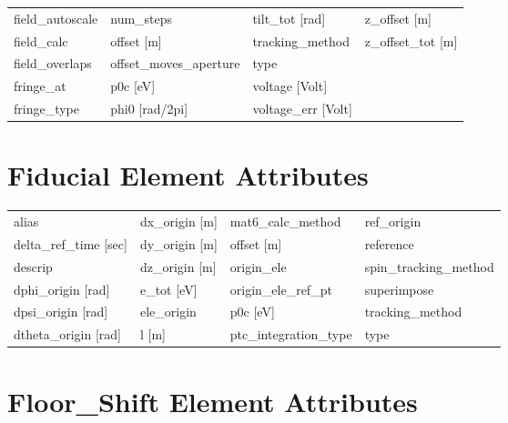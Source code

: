 \begin{tabular}{llll}
field_autoscale                & num_steps                      & tilt_tot [rad]                 & z_offset [m]                   \\
field_calc                     & offset [m]                     & tracking_method                & z_offset_tot [m]               \\
field_overlaps                 & offset_moves_aperture          & type                           &                                \\
fringe_at                      & p0c [eV]                       & voltage [Volt]                 &                                \\
fringe_type                    & phi0 [rad/2pi]                 & voltage_err [Volt]             &                                \\
 \bottomrule
 \end{tabular}
 \vfill
 
 \section{Fiducial Element Attributes}
 \label{s:list.fiducial}
 
 \begin{tabular}{llll} \toprule
alias                          & dx_origin [m]                  & mat6_calc_method               & ref_origin                     \\
delta_ref_time [sec]           & dy_origin [m]                  & offset [m]                     & reference                      \\
descrip                        & dz_origin [m]                  & origin_ele                     & spin_tracking_method           \\
dphi_origin [rad]              & e_tot [eV]                     & origin_ele_ref_pt              & superimpose                    \\
dpsi_origin [rad]              & ele_origin                     & p0c [eV]                       & tracking_method                \\
dtheta_origin [rad]            & l [m]                          & ptc_integration_type           & type                           \\
 \bottomrule
 \end{tabular}
 \vfill
 
 \section{Floor_Shift Element Attributes}
 \label{s:list.floor.shift}
 
